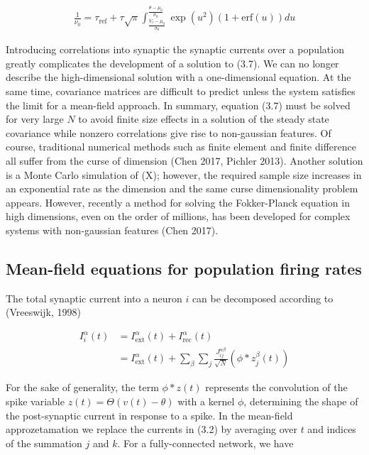 \documentclass{ucetd}
\begin{document}
\begin{align}
\frac{1}{\nu_{0}} = \tau_{\mathrm{ref}} + \tau\sqrt{\pi}\int_{\frac{V_{r}-\mu_{0}}{\sigma_{0}}}^{\frac{\theta-\mu_{0}}{\sigma_{0}}} \exp(u^{2})(1+\mathrm{erf}(u))du
\end{align}



Introducing correlations into synaptic the synaptic currents over a population greatly complicates the development of a solution to (3.7). We can no longer describe the high-dimensional solution with a one-dimensional equation. At the same time, covariance matrices are difficult to predict unless the system satisfies the limit for a mean-field approach. In summary, equation (3.7) must be solved for very large $N$ to avoid finite size effects in a solution of the steady state covariance while nonzero correlations give rise to non-gaussian features.  Of course, traditional numerical methods such as finite element and finite difference all suffer from the curse of dimension (Chen 2017, Pichler 2013). Another solution is a Monte Carlo simulation of (X); however, the required sample size increases in an exponential rate as the dimension and the same curse dimensionality problem appears. However, recently a method for solving the Fokker-Planck equation in high dimensions, even on the order of millions, has been developed for complex systems with non-gaussian features (Chen 2017). 

\subsection{Mean-field equations for population firing rates}

The total synaptic current into a neuron $i$ can be decomposed according to (Vreeswijk, 1998)

\begin{align}
I_{i}^{\alpha}(t) &= I_{\mathrm{ext}}^{\alpha}(t) + I_{\mathrm{rec}}^{\alpha}(t)\\
&= I_{\mathrm{ext}}^{\alpha}(t) + \sum_{\beta}\sum_{j} \frac{J_{ij}^{\alpha\beta}}{\sqrt{N}}(\phi * z^{\beta}_{j}(t))
\end{align}

For the sake of generality, the term $\phi * z(t)$ represents the convolution of the spike variable $z(t) = \Theta(v(t) - \theta)$ with a kernel $\phi$, determining the shape of the post-synaptic current in response to a spike. In the mean-field approzetamation we replace the currents in (3.2) by averaging over $t$ and indices of the summation $j$ and $k$. For a fully-connected network, we have
\end{document}
